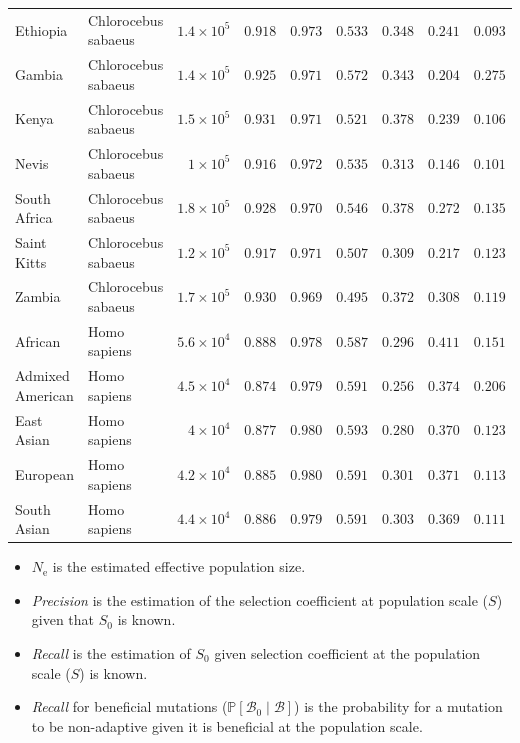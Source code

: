 \documentclass{article}
\newcommand{\Ne}{N_{\text{e}}}
\newcommand{\proba}{\mathbb{P}}
\newcommand{\Sphy}{S_{0}}
\newcommand{\SphyBen}{\mathcal{B}_0}
\newcommand{\given}{\mid}
\newcommand{\Spop}{S}
\newcommand{\SpopBen}{\mathcal{B}}
\begin{document}
\begin{center}
\begin{adjustbox}{width=\textwidth}
\begin{tabular}{||l|l|r||r|r||r|r||r|r||}
                \rowcolor{LIGHTGREY} Ethiopia & Chlorocebus sabaeus & $1.4\times 10^{5}$ & $ 0.918$ & $ 0.973$ & $ 0.533$ & $ 0.348$ & $ 0.241$ & $ 0.093$ \\
                \rowcolor{LIGHTGREY} Gambia & Chlorocebus sabaeus & $1.4\times 10^{5}$ & $ 0.925$ & $ 0.971$ & $ 0.572$ & $ 0.343$ & $ 0.204$ & $ 0.275$ \\
                \rowcolor{LIGHTGREY} Kenya & Chlorocebus sabaeus & $1.5\times 10^{5}$ & $ 0.931$ & $ 0.971$ & $ 0.521$ & $ 0.378$ & $ 0.239$ & $ 0.106$ \\
                \rowcolor{LIGHTGREY} Nevis & Chlorocebus sabaeus & $ 1\times 10^{5}$ & $ 0.916$ & $ 0.972$ & $ 0.535$ & $ 0.313$ & $ 0.146$ & $ 0.101$ \\
                \rowcolor{LIGHTGREY} South Africa & Chlorocebus sabaeus & $1.8\times 10^{5}$ & $ 0.928$ & $ 0.970$ & $ 0.546$ & $ 0.378$ & $ 0.272$ & $ 0.135$ \\
                \rowcolor{LIGHTGREY} Saint Kitts & Chlorocebus sabaeus & $1.2\times 10^{5}$ & $ 0.917$ & $ 0.971$ & $ 0.507$ & $ 0.309$ & $ 0.217$ & $ 0.123$ \\
                \rowcolor{LIGHTGREY} Zambia & Chlorocebus sabaeus & $1.7\times 10^{5}$ & $ 0.930$ & $ 0.969$ & $ 0.495$ & $ 0.372$ & $ 0.308$ & $ 0.119$ \\
                African & Homo sapiens & $5.6\times 10^{4}$ & $ 0.888$ & $ 0.978$ & $ 0.587$ & $ 0.296$ & $ 0.411$ & $ 0.151$ \\
                Admixed American & Homo sapiens & $4.5\times 10^{4}$ & $ 0.874$ & $ 0.979$ & $ 0.591$ & $ 0.256$ & $ 0.374$ & $ 0.206$ \\
                East Asian & Homo sapiens & $ 4\times 10^{4}$ & $ 0.877$ & $ 0.980$ & $ 0.593$ & $ 0.280$ & $ 0.370$ & $ 0.123$ \\
                European & Homo sapiens & $4.2\times 10^{4}$ & $ 0.885$ & $ 0.980$ & $ 0.591$ & $ 0.301$ & $ 0.371$ & $ 0.113$ \\
                South Asian & Homo sapiens & $4.4\times 10^{4}$ & $ 0.886$ & $ 0.979$ & $ 0.591$ & $ 0.303$ & $ 0.369$ & $ 0.111$ \\
                \bottomrule
            \end{tabular}
        \end{adjustbox}
    \end{center}
    \begin{itemize}
        \item $\Ne$ is the estimated effective population size.
        \item \textit{Precision} is the estimation of the selection coefficient at population scale ($\Spop$) given that $\Sphy$ is known.
        \item \textit{Recall} is the estimation of $\Sphy$ given selection coefficient at the population scale ($\Spop$) is known.
        \item \textit{Recall} for beneficial mutations ($\proba [\SphyBen \given \SpopBen]$) is the probability for a mutation to be non-adaptive given it is beneficial at the population scale.
    \end{itemize}
\end{document}
